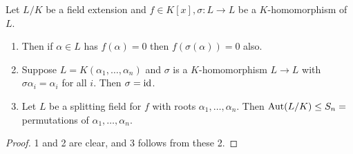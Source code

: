 \documentclass[10pt,a4paper]{article}
\begin{document}
\begin{lemma}
Let $L/K$ be a field extension and $f \in K[x], \sigma:L \to L$ be a $K$-homomorphism of $L$. 
\begin{enumerate}
\item Then if $\alpha \in L$ has $f(\alpha) = 0$ then $f(\sigma(\alpha)) = 0$ also.
\item Suppose $L = K(\alpha_1, \ldots, \alpha_n)$ and $\sigma$ is a $K$-homomorphism $L \to L$ with $\sigma \alpha_i =\alpha_i$ for all $i$. Then $\sigma = \operatorname{id}$.
\item Let $L$ be a splitting field for $f$ with roots $\alpha_1, \ldots, \alpha_n$. Then $\operatorname{Aut}(L/K) \leq S_n = $ permutations of $\alpha_1, \ldots, \alpha_n$.
\end{enumerate}
\end{lemma}
\begin{proof}
1 and 2 are clear, and 3 follows from these 2.
\end{proof}
\end{document}
